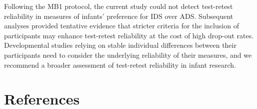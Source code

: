 \documentclass[
  man,floatsintext]{apa6}
\begin{document}
Following the MB1 protocol, the current study could not detect test-retest reliability in measures of infants' preference for IDS over ADS.
Subsequent analyses provided tentative evidence that stricter criteria for the inclusion of participants may enhance test-retest reliability at the cost of high drop-out rates.
Developmental studies relying on stable individual differences between their participants need to consider the underlying reliability of their measures, and we recommend a broader assessment of test-retest reliability in infant research.

\newpage

\hypertarget{references}{%
\section{References}\label{references}}

\begingroup
\setlength{\parindent}{-0.5in}
\setlength{\leftskip}{0.5in}
\end{document}
